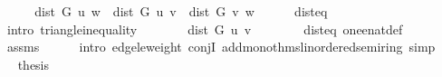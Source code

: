 \begin{isabellebody}
%
\isadelimproof
%
\endisadelimproof
%
\isatagproof
{}\isamarkupfalse%
\ {\isacharminus}{\kern0pt}\isanewline
\ \ \isamarkupfalse%
\ {\isachardoublequoteopen}dist\ G\ u\ w\ {\isasymle}\ dist\ G\ u\ v\ {\isacharplus}{\kern0pt}\ dist\ G\ v\ w{\isachardoublequoteclose}\isanewline
\ \ \ \ \isamarkupfalse%
\ dist{\isacharunderscore}{\kern0pt}eq{\isacharunderscore}{\kern0pt}{\isasymdelta}\isanewline
\ \ \ \ \isamarkupfalse%
\ {\isacharparenleft}{\kern0pt}intro\ {\isasymdelta}{\isacharunderscore}{\kern0pt}triangle{\isacharunderscore}{\kern0pt}inequality{\isacharparenright}{\kern0pt}\isanewline
\ \ \isamarkupfalse%
\ \isamarkupfalse%
\ {\isachardoublequoteopen}{\isachardot}{\kern0pt}{\isachardot}{\kern0pt}{\isachardot}{\kern0pt}\ {\isasymle}\ dist\ G\ u\ v\ {\isacharplus}{\kern0pt}\ {}{\isachardoublequoteclose}\isanewline
\ \ \ \ \isamarkupfalse%
\ dist{\isacharunderscore}{\kern0pt}eq{\isacharunderscore}{\kern0pt}{\isasymdelta}\ one{\isacharunderscore}{\kern0pt}enat{\isacharunderscore}{\kern0pt}def\isanewline
\ \ \ \ \isamarkupfalse%
\ assms\isanewline
\ \ \ \ \isamarkupfalse%
\ {\isacharparenleft}{\kern0pt}intro\ {\isasymdelta}{\isacharunderscore}{\kern0pt}edge{\isacharunderscore}{\kern0pt}le{\isacharunderscore}{\kern0pt}weight\ conjI\ add{\isacharunderscore}{\kern0pt}mono{\isacharunderscore}{\kern0pt}thms{\isacharunderscore}{\kern0pt}linordered{\isacharunderscore}{\kern0pt}semiring{\isacharparenleft}{\kern0pt}{}{\isacharparenright}{\kern0pt}{\isacharparenright}{\kern0pt}\ simp\isanewline
\ \ \isamarkupfalse%
\ \isamarkupfalse%
\ {\isacharquery}{\kern0pt}thesis\isanewline
\ \ \ \ \isacommand{{\isachardot}{\kern0pt}}\isamarkupfalse%
\isanewline
{}\isamarkupfalse%
%
\endisatagproof
{\isafoldproof}%
%
\isadelimproof
\isanewline
%
\endisadelimproof
%
\isadelimtheory
\isanewline
%
\endisadelimtheory
%
\isatagtheory
{}\isamarkupfalse%
%
\endisatagtheory
{\isafoldtheory}%
%
\isadelimtheory
%
\endisadelimtheory
%
\end{isabellebody}%
\endinput
